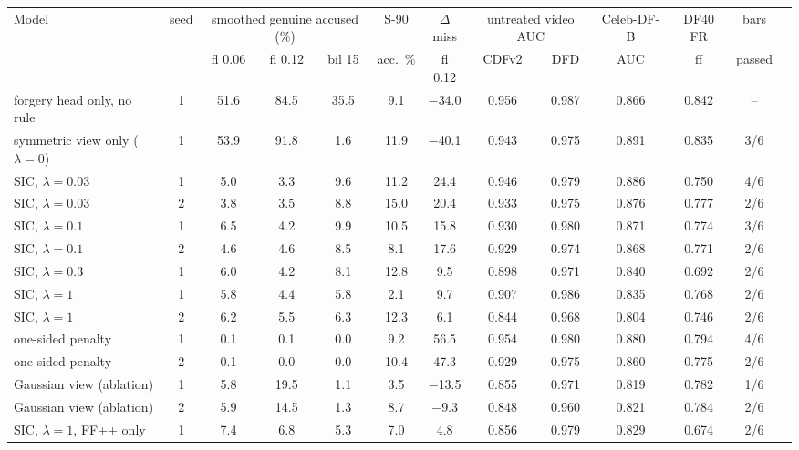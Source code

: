 \begin{tabular}{@{}lcccccccccccc@{}}
\toprule
Model & seed & \multicolumn{3}{c}{smoothed genuine accused (\%)} & S-90 & $\Delta$miss & \multicolumn{2}{c}{untreated video AUC} & Celeb-DF-B & DF40 FR & bars \\
 & & fl 0.06 & fl 0.12 & bil 15 & acc.\ \% & fl 0.12 & CDFv2 & DFD & AUC & ff & passed \\
\midrule
forgery head only, no rule & 1 & 51.6 & 84.5 & 35.5 & 9.1 & $-$34.0 & 0.956 & 0.987 & 0.866 & 0.842 & -- \\
\midrule
symmetric view only ($\lambda=0$) & 1 & 53.9 & 91.8 & 1.6 & 11.9 & $-$40.1 & 0.943 & 0.975 & 0.891 & 0.835 & 3/6 \\
SIC, $\lambda=0.03$ & 1 & 5.0 & 3.3 & 9.6 & 11.2 & 24.4 & 0.946 & 0.979 & 0.886 & 0.750 & 4/6 \\
SIC, $\lambda=0.03$ & 2 & 3.8 & 3.5 & 8.8 & 15.0 & 20.4 & 0.933 & 0.975 & 0.876 & 0.777 & 2/6 \\
SIC, $\lambda=0.1$ & 1 & 6.5 & 4.2 & 9.9 & 10.5 & 15.8 & 0.930 & 0.980 & 0.871 & 0.774 & 3/6 \\
SIC, $\lambda=0.1$ & 2 & 4.6 & 4.6 & 8.5 & 8.1 & 17.6 & 0.929 & 0.974 & 0.868 & 0.771 & 2/6 \\
SIC, $\lambda=0.3$ & 1 & 6.0 & 4.2 & 8.1 & 12.8 & 9.5 & 0.898 & 0.971 & 0.840 & 0.692 & 2/6 \\
SIC, $\lambda=1$ & 1 & 5.8 & 4.4 & 5.8 & 2.1 & 9.7 & 0.907 & 0.986 & 0.835 & 0.768 & 2/6 \\
SIC, $\lambda=1$ & 2 & 6.2 & 5.5 & 6.3 & 12.3 & 6.1 & 0.844 & 0.968 & 0.804 & 0.746 & 2/6 \\
one-sided penalty & 1 & 0.1 & 0.1 & 0.0 & 9.2 & 56.5 & 0.954 & 0.980 & 0.880 & 0.794 & 4/6 \\
one-sided penalty & 2 & 0.1 & 0.0 & 0.0 & 10.4 & 47.3 & 0.929 & 0.975 & 0.860 & 0.775 & 2/6 \\
Gaussian view (ablation) & 1 & 5.8 & 19.5 & 1.1 & 3.5 & $-$13.5 & 0.855 & 0.971 & 0.819 & 0.782 & 1/6 \\
Gaussian view (ablation) & 2 & 5.9 & 14.5 & 1.3 & 8.7 & $-$9.3 & 0.848 & 0.960 & 0.821 & 0.784 & 2/6 \\
SIC, $\lambda=1$, FF++ only & 1 & 7.4 & 6.8 & 5.3 & 7.0 & 4.8 & 0.856 & 0.979 & 0.829 & 0.674 & 2/6 \\
\bottomrule
\end{tabular}
